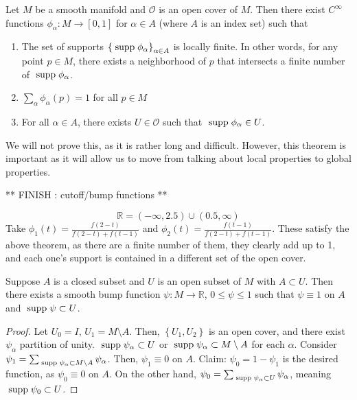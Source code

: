 \documentclass{../mathnotes}
\begin{document}
\begin{thm}
    Let $M$ be a smooth manifold and $\mathcal{O}$ is an open cover of $M$. Then there exist $C^\infty$ functions $\phi_\alpha:M\to[0,1]$ for
    $\alpha\in A$ (where $A$ is an index set) such that
    \begin{enumerate}
        \item The set of supports $\left\{ \;\textnormal{supp}\;\phi_\alpha \right\}_{\alpha\in A}$ is locally finite. In other words, for any point $p\in M$, there
            exists a neighborhood of $p$ that intersects a finite number of $\;\textnormal{supp}\;\phi_\alpha$.
        \item $\sum_\alpha\phi_\alpha(p)=1$ for all $p\in M$
        \item For all $\alpha\in A$, there exists $U\in\mathcal{O}$ such that $\;\textnormal{supp}\;\phi_\alpha\in U$.
    \end{enumerate}
\end{thm}
We will not prove this, as it is rather long and difficult. However, this theorem is important as it will allow us to move from talking about local
properties to global properties.

** FINISH : cutoff/bump functions **

\begin{exmp}
    \[\mathbb{R}=(-\infty,2.5)\cup(0.5,\infty)\]
    Take $\phi_1(t)=\frac{f(2-t)}{f(2-t)+f(t-1)}$ and $\phi_2(t)=\frac{f(t-1)}{f(2-t)+f(t-1)}$. These satisfy the above theorem, as there are a finite number of them,
    they clearly add up to 1, and each one's support is contained in a different set of the open cover.
\end{exmp}

\begin{thm}
Suppose $A$ is a closed subset and $U$ is an open subset of $M$ with $A\subset U$. Then there exists a smooth bump function $\psi:M\to\mathbb{R}$,
$0\leq\psi\leq1$ such that $\psi\equiv 1$ on $A$ and $\;\textnormal{supp}\;\psi\subset U$.
\end{thm}
\begin{proof}
    Let $U_0=I$, $U_1=M\setminus A$. Then, $\left\{ U_1,U_2 \right\}$ is an open cover, and there exist $\psi_\alpha$ partition of unity. $\;\textnormal{supp}\;\psi_\alpha\subset U$
    or $\;\textnormal{supp}\;\psi_\alpha\subset M\setminus A$ for each $\alpha$. Consider $\psi_1=\sum_{\;\textnormal{supp}\;\psi_\alpha\subset M\setminus A}\psi_\alpha$. Then, $\psi_1\equiv 0$
    on $A$. Claim: $\psi_0=1-\psi_1$ is the desired function, as $\psi_0\equiv0$ on $A$. On the other hand, $\psi_0=\sum_{\;\textnormal{supp}\;\psi_\alpha\subset U}\psi_\alpha$,
    meaning $\;\textnormal{supp}\;\psi_0\subset U$.
\end{proof}
\end{document}
